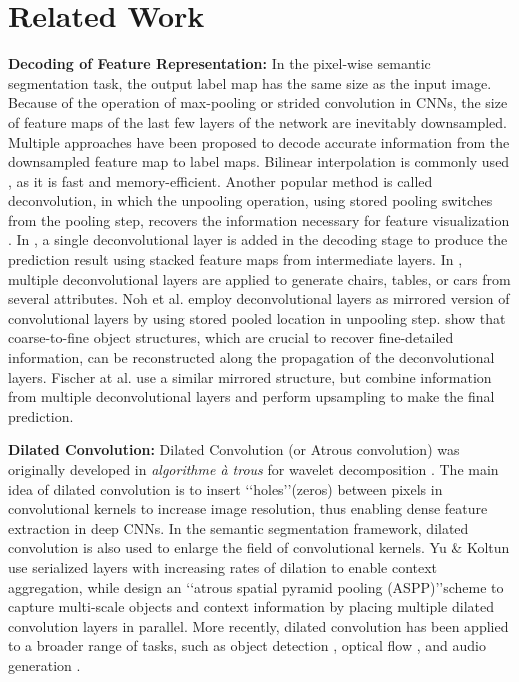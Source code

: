 \documentclass[10pt,twocolumn,letterpaper]{article}
\begin{document}
\section{Related Work}
\textbf{Decoding of Feature Representation:} In the pixel-wise semantic segmentation task, the output label map has the same size as the input image. Because of the operation of max-pooling or strided convolution in CNNs, the size of feature maps of the last few layers of the network are inevitably downsampled. Multiple approaches have been proposed to decode accurate information from the downsampled feature map to label maps. Bilinear interpolation is commonly used \cite{lin2015efficient,liu2015semantic,chen2016deeplab}, as it is fast and memory-efficient. Another popular method is called deconvolution, in which the unpooling operation, using stored pooling switches from the pooling step, recovers the information necessary for feature visualization \cite{zeiler2014visualizing}. In \cite{long2015fully}, a single deconvolutional layer is added in the decoding stage to produce the prediction result using stacked feature maps from intermediate layers. In \cite{dosovitskiy2015learning}, multiple deconvolutional layers are applied to generate chairs, tables, or cars from several attributes. Noh et al. \cite{noh2015learning} employ deconvolutional layers as mirrored version of convolutional layers by using stored pooled location in unpooling step. \cite{noh2015learning} show that coarse-to-fine object structures, which are crucial to recover fine-detailed information, can be reconstructed along the propagation of the deconvolutional layers. Fischer at al. \cite{fischer2015flownet} use a similar mirrored structure, but combine information from multiple deconvolutional layers and perform upsampling to make the final prediction.

\textbf{Dilated Convolution:} Dilated Convolution (or Atrous convolution) was originally developed in \textit{algorithme \`{a} trous} for wavelet decomposition \cite{holschneider1990real}. The main idea of dilated convolution is to insert \lq\lq holes\rq\rq (zeros) between pixels in convolutional kernels to increase image resolution, thus enabling dense feature extraction in deep CNNs. In the semantic segmentation framework, dilated convolution is also used to enlarge the field of convolutional kernels. Yu \& Koltun \cite{yu2015multi} use serialized layers with increasing rates of dilation to enable context aggregation, while \cite{chen2016deeplab} design an \lq\lq atrous spatial pyramid pooling (ASPP)\rq\rq scheme to capture multi-scale objects and context information by placing multiple dilated convolution layers in parallel. More recently, dilated convolution has been applied to a broader range of tasks, such as object detection \cite{dai2016r}, optical flow \cite{sevilla2016optical}, and audio generation \cite{wavenet}.
\end{document}
